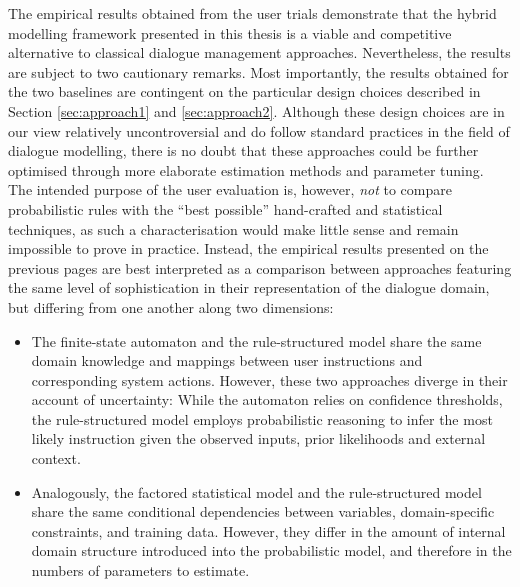 The empirical results obtained from the user trials demonstrate that the hybrid modelling framework presented in this thesis is a viable and competitive alternative to classical dialogue management approaches.  Nevertheless, the results are subject to two cautionary remarks.  Most importantly, the results obtained for the two baselines are contingent on the particular design choices described in Section \ref{sec:approach1} and \ref{sec:approach2}.  Although these design choices are in our view relatively uncontroversial and do follow standard practices in the field of dialogue modelling, there is no doubt that these approaches could be further optimised through more elaborate estimation methods and parameter tuning. The intended purpose of the user evaluation is, however, \textit{not} to compare probabilistic rules with the ``best possible'' hand-crafted and statistical techniques, as such a characterisation would make little sense and remain impossible to prove in practice. Instead, the empirical results presented on the previous pages are best interpreted as a comparison between approaches featuring the same level of sophistication in their representation of the dialogue domain, but differing from one another along two dimensions:
\begin{itemize}
\item The finite-state automaton and the rule-structured model share the same domain knowledge and mappings between user instructions and corresponding system actions.  However, these two approaches diverge in their account of uncertainty: While the automaton relies on confidence thresholds, the rule-structured model employs probabilistic reasoning to infer the most likely instruction given the observed inputs, prior likelihoods and external context.
\item Analogously, the factored statistical model and the rule-structured model share the same conditional dependencies between variables, domain-specific constraints, and training data. However, they differ in the amount of internal domain structure introduced into the probabilistic model, and therefore in the numbers of parameters to estimate.
\end{itemize}

